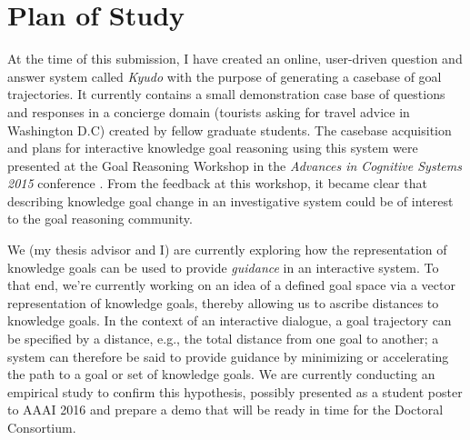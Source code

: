 \documentclass[letterpaper]{article}
\begin{document}
\section{Plan of Study}

At the time of this submission, I have created an online, user-driven question and answer system called \textit{Kyudo} with the purpose of generating a casebase of goal trajectories. It currently contains a small demonstration case base of questions and responses in a concierge domain (tourists asking for travel advice in Washington D.C) created by fellow graduate students. The casebase acquisition and plans for interactive knowledge goal reasoning using this system were presented at the Goal Reasoning Workshop in the \textit{Advances in Cognitive Systems 2015} conference \cite{bengfort_interactive_2015}. From the feedback at this workshop, it became clear that describing knowledge goal change in an investigative system could be of interest to the goal reasoning community.

We (my thesis advisor and I) are currently exploring how the representation of knowledge goals can be used to provide \textit{guidance} in an interactive system. To that end, we're currently working on an idea of a defined goal space via a vector representation of knowledge goals, thereby allowing us to ascribe distances to knowledge goals. In the context of an interactive dialogue, a goal trajectory can be specified by a distance, e.g., the total distance from one goal to another; a system can therefore be said to provide guidance by minimizing or accelerating the path to a goal or set of knowledge goals. We are currently conducting an empirical study to confirm this hypothesis, possibly presented as a student poster to AAAI 2016 and prepare a demo that will be ready in time for the Doctoral Consortium.



\end{document}
